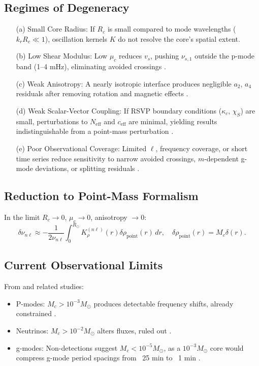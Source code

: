 \documentclass{article}
\begin{document}
\subsection{Regimes of Degeneracy}

\begin{enumerate}
\item[(a)] Small Core Radius: If $R_c$ is small compared to mode wavelengths ($k_r R_c \ll 1$), oscillation kernels $K$ do not resolve the core’s spatial extent.
\item[(b)] Low Shear Modulus: Low $\mu_c$ reduces $v_s$, pushing $\nu_{s,1}$ outside the p-mode band (1--4 mHz), eliminating avoided crossings \citep{aerts2010}.
\item[(c)] Weak Anisotropy: A nearly isotropic interface produces negligible $a_2$, $a_4$ residuals after removing rotation and magnetic effects \citep{lund2017}.
\item[(d)] Weak Scalar-Vector Coupling: If RSVP boundary conditions ($\kappa_c$, $\chi_S$) are small, perturbations to $N_{\text{eff}}$ and $c_{\text{eff}}$ are minimal, yielding results indistinguishable from a point-mass perturbation \citep{kunitomo2022}.
\item[(e)] Poor Observational Coverage: Limited $\ell$, frequency coverage, or short time series reduce sensitivity to narrow avoided crossings, $m$-dependent g-mode deviations, or splitting residuals \citep{lund2017}.
\end{enumerate}

\subsection{Reduction to Point-Mass Formalism}

In the limit $R_c \to 0$, $\mu_c \to 0$, anisotropy $\to 0$:
\[
\delta \nu_{n\ell} \approx -\frac{1}{2 \nu_{n\ell}} \int_0^{R_\odot} K_\rho^{(n\ell)}(r) \delta \rho_{\text{point}}(r) \, dr, \quad \delta \rho_{\text{point}}(r) = M_c \delta(r).
\]

\subsection{Current Observational Limits}

From \citet{bellinger2025} and related studies:
\begin{itemize}
\item P-modes: $M_c > 10^{-3} M_\odot$ produces detectable frequency shifts, already constrained \citep{aerts2010, lund2017}.
\item Neutrinos: $M_c > 10^{-2} M_\odot$ alters fluxes, ruled out \citep{ahmad2002}.
\item g-modes: Non-detections suggest $M_c < 10^{-5} M_\odot$, as a $10^{-3} M_\odot$ core would compress g-mode period spacings from ~25 min to ~1 min \citep{bellinger2025}.
\end{itemize}
\end{document}
